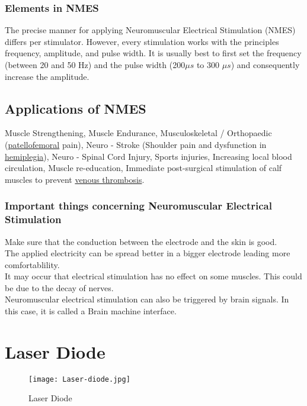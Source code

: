 \documentclass[12pt]{article}
\begin{document}
\subsubsection{Elements in  NMES}
The precise manner for applying Neuromuscular Electrical Stimulation (NMES) differs per stimulator. However, every stimulation works with the principles
frequency, amplitude, and pulse width.
 It is usually best to first set the frequency (between 20 and 50 Hz) and the pulse width (200$\mu s$ to 300 $\mu s$) and consequently increase the amplitude.\cite{Simulation:2018}
 
 \subsection{Applications of NMES }
Muscle Strengthening, Muscle Endurance, Musculoskeletal / Orthopaedic (\href{https://en.wikipedia.org/wiki/Patellofemoral}{patellofemoral} pain), Neuro - Stroke (Shoulder pain and dysfunction in \href{https://medical-dictionary.thefreedictionary.com/hemiplegia}{hemiplegia}), Neuro - Spinal Cord Injury, Sports injuries, Increasing local blood circulation, Muscle re-education, Immediate post-surgical stimulation of calf muscles to prevent \href{https://en.wikipedia.org/wiki/Venous_thrombosis}{venous thrombosis}. 
 
\subsubsection{Important things concerning Neuromuscular Electrical Stimulation}
  
  Make sure that the conduction between the electrode and the skin is good. \\
  The applied electricity can be spread better in a bigger electrode leading more comfortablility.\\
  It may occur that electrical stimulation has no effect on some muscles. This could be due to the decay of nerves.\\
  Neuromuscular electrical stimulation can also be triggered by brain signals. In this case, it is called a Brain machine interface.
 
 \section{Laser Diode}
 \begin{wrapfigure}{r}{0.4\textwidth}
\centering
\hspace{-1.2cm} \vspace{-2mm}
    \texttt{[image: Laser-diode.jpg]}
    \caption{Laser Diode}
    \label{fig:Diode}
\end{wrapfigure}
\end{document}
